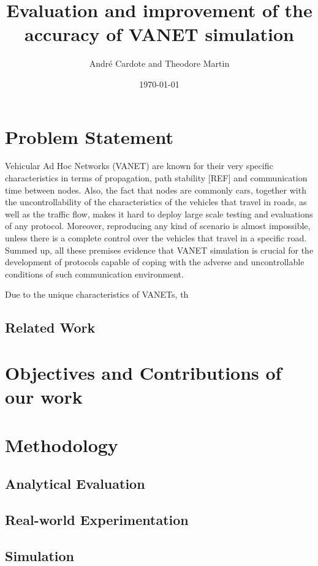 \documentclass[12pt]{article}
\title{Evaluation and improvement of the accuracy of VANET simulation}
\date{\today}
\author{Andr\'e Cardote and Theodore Martin}
\begin{document}
  \maketitle 
  
\section{Problem Statement}
Vehicular Ad Hoc Networks (VANET) are known for their very specific characteristics in terms of propagation, path stability [REF] and communication time between nodes. Also, the fact that nodes are commonly cars, together with the uncontrollability of the characteristics of the vehicles that travel in roads, as well as the traffic flow,  makes it hard to deploy large scale testing and evaluations of any protocol. Moreover, reproducing any kind of scenario is almost impossible, unless there is a complete control over the vehicles that travel in a specific road. Summed up, all these premises evidence that VANET simulation is crucial for the development of protocols capable of coping with the adverse and uncontrollable conditions of such communication environment.

Due to the unique characteristics of VANETs, th
\subsection{Related Work}

\section{Objectives and Contributions of our work}

\section{Methodology}

\subsection{Analytical Evaluation}

\subsection{Real-world Experimentation}

\subsection{Simulation}
\end{document}
